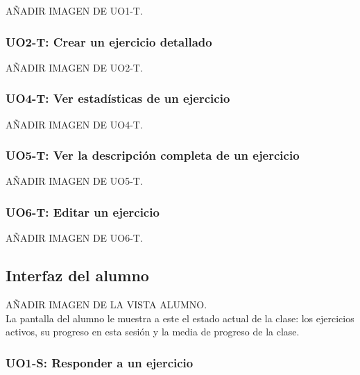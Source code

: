 AÑADIR IMAGEN DE UO1-T.\\

\subsubsection{UO2-T: Crear un ejercicio detallado}
\label{diseno-e-implementacion:interfaces:profesor:uo2-t}

AÑADIR IMAGEN DE UO2-T.\\

\subsubsection{UO4-T: Ver estadísticas de un ejercicio}
\label{diseno-e-implementacion:interfaces:profesor:uo4-t}

AÑADIR IMAGEN DE UO4-T.\\

\subsubsection{UO5-T: Ver la descripción completa de un ejercicio}
\label{diseno-e-implementacion:interfaces:profesor:uo5-t}

AÑADIR IMAGEN DE UO5-T.\\

\subsubsection{UO6-T: Editar un ejercicio}
\label{diseno-e-implementacion:interfaces:profesor:uo6-t}

AÑADIR IMAGEN DE UO6-T.\\

\subsection{Interfaz del alumno}
\label{diseno-e-implementacion:interfaces:alumno}

AÑADIR IMAGEN DE LA VISTA ALUMNO.\\

La pantalla del alumno le muestra a este el estado actual de la clase: los ejercicios activos, su progreso en esta sesión y la media de progreso de la clase.

\subsubsection{UO1-S: Responder a un ejercicio}
\label{diseno-e-implementacion:interfaces:alumno:uo1-s}

